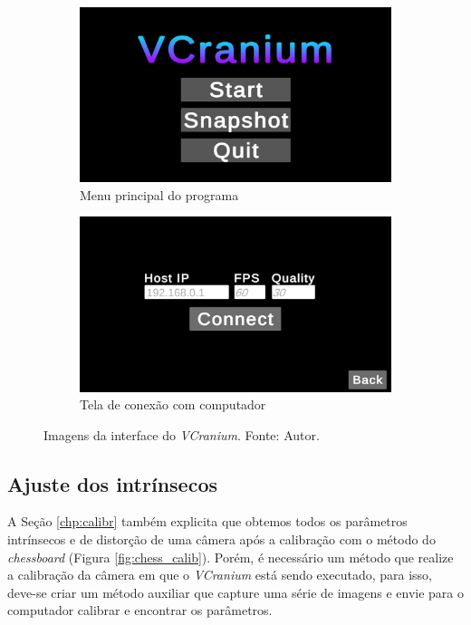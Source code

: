 \begin{figure}[ht]
    \centering
        \begin{subfigure}{.45\textwidth}
            \centering
            \includegraphics[width=.95\linewidth]{figuras/vcranium_main.png}
            \caption{Menu principal do programa}
            \label{fig:vcranium-connect}
        \end{subfigure}
        \begin{subfigure}{.45\textwidth}
            \centering
            \includegraphics[width=.95\linewidth]{figuras/vcranium_connect.png}
            \caption{Tela de conexão com computador}
            \label{fig:vcranium2-connect}
        \end{subfigure}
        \caption{Imagens da interface do \textit{VCranium}. Fonte: Autor.}
        \label{fig:ui1}
\end{figure}

\subsection{Ajuste dos intrínsecos}

A Seção \ref{chp:calibr} também explicita que obtemos todos os parâmetros intrínsecos e de distorção de uma câmera após a calibração com o método do \textit{chessboard} (Figura \ref{fig:chess_calib}). Porém, é necessário um método que realize a calibração da câmera em que o \textit{VCranium} está sendo executado, para isso, deve-se criar um método auxiliar que capture uma série de imagens e envie para o computador calibrar e encontrar os parâmetros.

